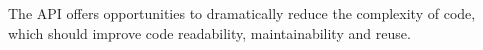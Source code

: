 The  API offers opportunities to dramatically reduce the complexity 
of code, which should improve code readability, maintainability and reuse.



\address{Dirk Eddelbuettel\\
  Debian Project\\
  Chicago, IL\\
  USA}\\

\address{Romain Fran\c{c}ois\\
  Professionnal R Enthusiast\\
  3 rue Emile Bonnet, 34 090 Montpellier\\
  FRANCE}\\

